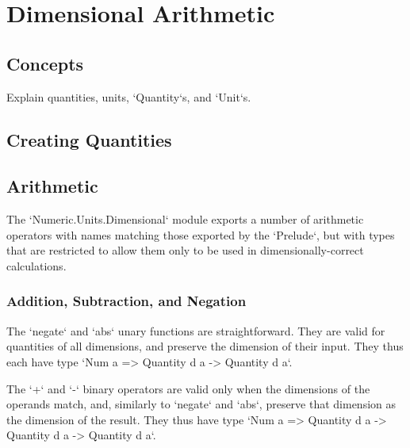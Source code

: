 \documentclass[11pt]{report}
\begin{document}




\chapter{Dimensional Arithmetic}

\section{Concepts}

Explain quantities, units, `Quantity`s, and `Unit`s.


\section{Creating Quantities}


\section{Arithmetic}

The `Numeric.Units.Dimensional` module exports a number of arithmetic operators with names matching those
exported by the `Prelude`, but with types that are restricted to allow them only to be used in dimensionally-correct
calculations.

\subsection{Addition, Subtraction, and Negation}

The `negate` and `abs` unary functions are straightforward. They are valid for quantities of all dimensions, and preserve the
dimension of their input. They thus each have type `Num a => Quantity d a -> Quantity d a`.

The `+` and `-` binary operators are valid only when the dimensions of the operands match, and,
similarly to `negate` and `abs`, preserve that dimension as the dimension of the result.
They thus have type `Num a => Quantity d a -> Quantity d a -> Quantity d a`.
\end{document}
